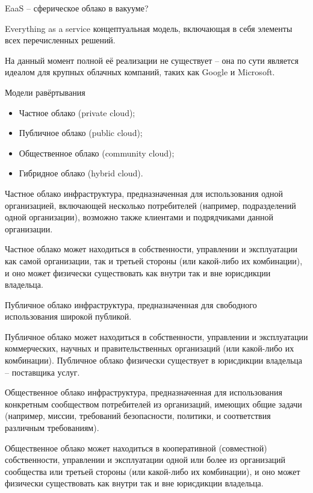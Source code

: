 \begin{frame}{EaaS -- сферическое облако в вакууме?}
	\begin{block}{Everything as a service}
		концептуальная модель, включающая в себя элементы всех перечисленных решений.
		
		На данный момент полной её реализации не существует -- она по сути является идеалом для крупных облачных компаний, таких как Google и Microsoft.
	\end{block}
\end{frame}


\begin{frame}{Модели равёртывания}
	\begin{itemize}
		\item Частное облако (private cloud);
		\item Публичное облако (public cloud);
		\item Общественное облако (community cloud);
		\item Гибридное облако (hybrid cloud).
	\end{itemize}
\end{frame}


\begin{frame}{Частное облако}
инфраструктура,  предназначенная для использования одной организацией,  включающей несколько потребителей (например,  подразделений одной организации),  возможно также клиентами и подрядчиками данной организации.

\bigskip
Частное облако может находиться в собственности,  управлении и эксплуатации как самой организации,  так и третьей стороны (или какой-либо их комбинации),  и оно может физически существовать как внутри так и вне юрисдикции владельца.
\end{frame}


\begin{frame}{Публичное облако}
инфраструктура,  предназначенная для свободного использования широкой публикой. 

\bigskip
Публичное облако может находиться в собственности,  управлении и эксплуатации коммерческих,  научных и правительственных организаций (или какой-либо их комбинации). Публичное облако физически существует в юрисдикции владельца -- поставщика услуг.
\end{frame}

\begin{frame}{Общественное облако}
инфраструктура,  предназначенная для использования конкретным сообществом потребителей из организаций,  имеющих общие задачи (например,  миссии,  требований безопасности,  политики,  и соответствия различным требованиям).

\bigskip
Общественное облако может находиться в кооперативной (совместной) собственности,  управлении и эксплуатации одной или более из организаций сообщества или третьей стороны (или какой-либо их комбинации),  и оно может физически существовать как внутри так и вне юрисдикции владельца.
\end{frame}

